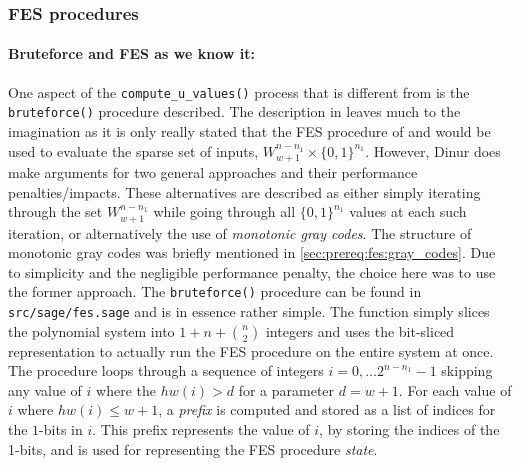 \subsubsection{FES procedures} \label{sec:impl:fes}

\paragraph{Bruteforce and FES as we know it:} One aspect of the \texttt{compute\_u\_values()} process that is different from \cite{eurocrypt-2021-30841} is the \texttt{bruteforce()} procedure described. The description in \cite{eurocrypt-2021-30841} leaves much to the imagination as it is only really stated that the FES procedure of \cite{cryptoeprint:2013/436} and \cite{ches-2010-23990} would be used to evaluate the sparse set of inputs, $W^{n - n_1}_{w + 1} \times \{0,1\}^{n_1}$. However, Dinur does make arguments for two general approaches and their performance penalties/impacts. These alternatives are described as either simply iterating through the set $W^{n - n_1}_{w + 1}$ while going through all $\{0,1\}^{n_1}$ values at each such iteration, or alternatively the use of \textit{monotonic gray codes}. The structure of monotonic gray codes was briefly mentioned in \cref{sec:prereq:fes:gray_codes}. Due to simplicity and the negligible performance penalty, the choice here was to use the former approach. 
The \texttt{bruteforce()} procedure can be found in \texttt{src/sage/fes.sage} and is in essence rather simple. The function simply slices the polynomial system into $1 + n + \binom{n}{2}$ integers and uses the bit-sliced representation to actually run the FES procedure on the entire system at once. The procedure loops through a sequence of integers $i = 0, \dots 2^{n - n_1} - 1$ skipping any value of $i$ where the $hw(i) > d$ for a parameter $d = w + 1$. For each value of $i$ where $hw(i) \leq w + 1$, a \textit{prefix} is computed and stored as a list of indices for the $1$-bits in $i$.
This prefix represents the value of $i$, by storing the indices of the 1-bits, and is used for representing the FES procedure \textit{state}.


